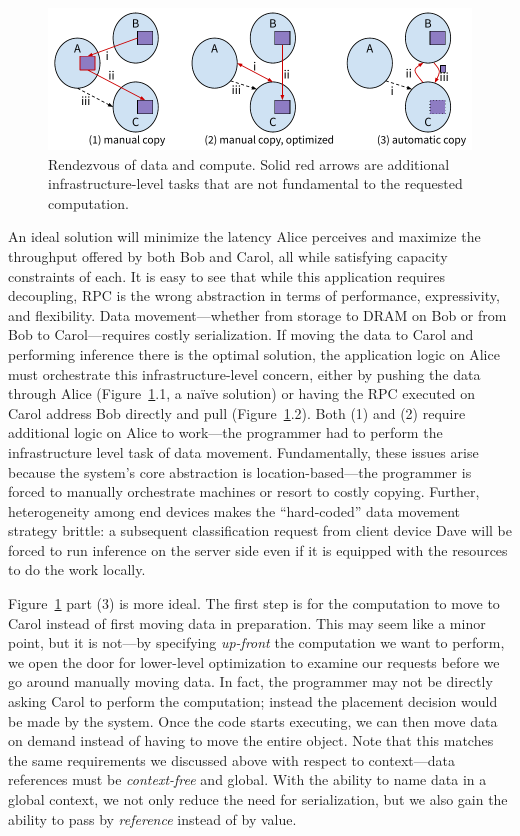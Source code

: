 \begin{figure}
    \centering
    \includegraphics[width=\linewidth]{fig/copy}
    \caption{Rendezvous of data and compute. Solid red arrows are additional
        infrastructure-level tasks that are not fundamental to the requested computation.}
    \label{fig:rpccopy}
\end{figure}

An ideal solution will minimize the latency Alice perceives and maximize the throughput offered
by both Bob and Carol, all while satisfying capacity constraints of each. It is easy to see
that while this application requires decoupling, RPC is the wrong abstraction in terms of performance,
expressivity, and flexibility.  Data movement---whether from storage to DRAM on Bob or from Bob
to Carol---requires costly serialization. If moving the data to Carol and performing
inference there is the optimal solution, the application logic on Alice must orchestrate this
infrastructure-level concern, either by pushing the data through Alice (Figure~\ref{fig:rpccopy}.1, a na\"ive solution)
or having the RPC executed
on Carol address Bob directly and pull (Figure~\ref{fig:rpccopy}.2).
Both (1) and (2) require additional logic on Alice
to work---the programmer had to perform the infrastructure level task of data
movement.  Fundamentally, these issues arise because the system's core abstraction is
location-based---the programmer is forced to manually orchestrate machines or resort to
costly copying.
Further,
heterogeneity among end devices makes the ``hard-coded'' data movement strategy
brittle:
a subsequent classification request from client device Dave will be forced to run inference
on the server side even if it is equipped with the resources to do the work locally.

Figure~\ref{fig:rpccopy} part (3) is more ideal. The first step is for
the computation to move to Carol instead of first moving data in preparation.  This may seem like a
minor point, but it is not---by specifying \emph{up-front} the computation we want to perform, we
open the door for lower-level optimization to examine our requests before we go around manually
moving data.  In fact, the programmer may not be directly asking Carol to perform the
computation; instead the placement decision would be made by the system. Once the code starts
executing, we can then move data on demand instead of having to move the entire
object.
Note that this matches the same requirements we discussed above with respect to context---data references must
be \emph{context-free} and global. With the ability to name data in a global context, we not only reduce the need for
serialization, but we also gain the ability to pass by \emph{reference} instead of by value.



